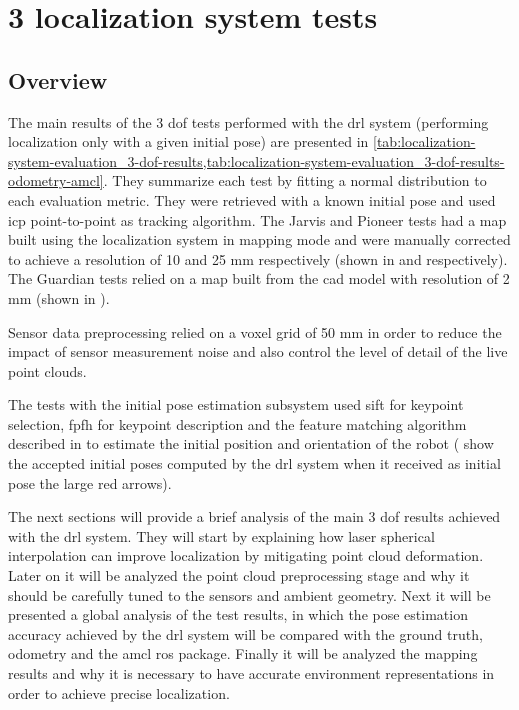 \section{3  localization system tests}\label{sec:planar-localization-system-tests}


\subsection{Overview}

The main results of the 3 \gls{dof} tests performed with the \gls{drl} system (performing localization only with a given initial pose) are presented in \cref{tab:localization-system-evaluation_3-dof-results,tab:localization-system-evaluation_3-dof-results-odometry-amcl}. They summarize each test by fitting a normal distribution to each evaluation metric. They were retrieved with a known initial pose and used \gls{icp} point-to-point as tracking algorithm. The Jarvis and Pioneer tests had a map built using the localization system in mapping mode and were manually corrected to achieve a resolution of 10 and 25 mm respectively (shown in  and  respectively). The Guardian tests relied on a map built from the \gls{cad} model with resolution of 2 mm (shown in ).

Sensor data preprocessing relied on a voxel grid of 50 mm in order to reduce the impact of sensor measurement noise and also control the level of detail of the live point clouds.

The tests with the initial pose estimation subsystem used \gls{sift} for keypoint selection, \gls{fpfh} for keypoint description and the feature matching algorithm described in  to estimate the initial position and orientation of the robot ( show the accepted initial poses computed by the \gls{drl} system when it received as initial pose the large red arrows).

The next sections will provide a brief analysis of the main 3 \gls{dof} results achieved with the \gls{drl} system. They will start by explaining how laser spherical interpolation can improve localization by mitigating point cloud deformation. Later on it will be analyzed the point cloud preprocessing stage and why it should be carefully tuned to the sensors and ambient geometry. Next it will be presented a global analysis of the test results, in which the pose estimation accuracy achieved by the \gls{drl} system will be compared with the ground truth, odometry and the \gls{amcl} \gls{ros} package. Finally it will be analyzed the mapping results and why it is necessary to have accurate environment representations in order to achieve precise localization.


